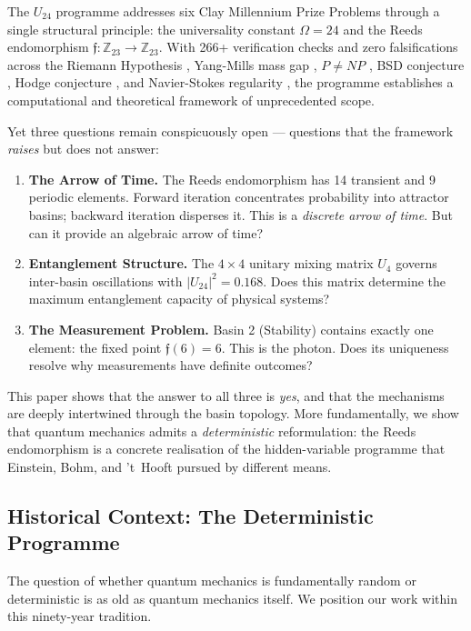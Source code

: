 \documentclass[12pt,a4paper]{article}
\theoremstyle{definition}
\theoremstyle{remark}
\newcommand{\Reeds}{\mathfrak{f}}
\newcommand{\Zp}{\mathbb{Z}_{23}}
\newcommand{\Umix}{U_4}
\begin{document}
The $U_{24}$ programme \cite{dwr2026} addresses six Clay Millennium Prize
Problems through a single structural principle: the universality constant
$\Omega = 24$ and the Reeds endomorphism $\Reeds: \Zp \to \Zp$. With 266+
verification checks and zero falsifications across the Riemann Hypothesis
\cite{dwr_rh}, Yang-Mills mass gap \cite{dwr_ym}, $P \neq NP$ \cite{dwr_pvsnp},
BSD conjecture \cite{dwr_bsd}, Hodge conjecture \cite{dwr_hodge}, and
Navier-Stokes regularity \cite{dwr_ns}, the programme establishes a
computational and theoretical framework of unprecedented scope.

Yet three questions remain conspicuously open --- questions that the framework
\emph{raises} but does not answer:

\begin{enumerate}[label=\textbf{Q\arabic*.}]
  \item \textbf{The Arrow of Time.} The Reeds endomorphism has 14 transient and
  9 periodic elements. Forward iteration concentrates probability into attractor
  basins; backward iteration disperses it. This is a \emph{discrete arrow of
  time}. But can it provide an algebraic arrow of time?

  \item \textbf{Entanglement Structure.} The $4 \times 4$ unitary mixing matrix
  $\Umix$ governs inter-basin oscillations with $|U_{24}|^2 = 0.168$. Does this
  matrix determine the maximum entanglement capacity of physical systems?

  \item \textbf{The Measurement Problem.} Basin 2 (Stability) contains exactly
  one element: the fixed point $\Reeds(6) = 6$. This is the photon. Does its
  uniqueness resolve why measurements have definite outcomes?
\end{enumerate}

This paper shows that the answer to all three is \emph{yes}, and that the
mechanisms are deeply intertwined through the basin topology. More fundamentally,
we show that quantum mechanics admits a \emph{deterministic} reformulation: the
Reeds endomorphism is a concrete realisation of the hidden-variable programme
that Einstein, Bohm, and 't~Hooft pursued by different means.

\subsection{Historical Context: The Deterministic Programme}

The question of whether quantum mechanics is fundamentally random or
deterministic is as old as quantum mechanics itself. We position our work within
this ninety-year tradition.
\end{document}
